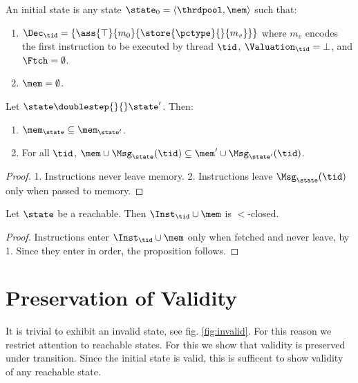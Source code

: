 %
\begin{definition}
An initial state is any state $\state_0 = \langle \thrdpool,\mem\rangle$ such that:
\begin{enumerate}
\item $\Dec_\tid=\{\ass{\top}{m_0}{\store{\pctype}{}{m_v}} \}$ where $m_v$ encodes the first instruction to be executed by thread $\tid$, $\Valuation_\tid = \bot$, and $\Ftch = \emptyset$.
\item $\mem = \emptyset$.
\end{enumerate}
\end{definition}
%

\begin{proposition}
\label{prop:storeMonotonicity}
Let $\state\doublestep{}{}\state'$. Then:
\begin{enumerate}
\item $\mem_{\state}\subseteq\mem_{\state'}$.
\item For all $\tid$, $\mem\cup\Msg_\state(\tid)\subseteq\mem'\cup\Msg_{\state'}(\tid)$.
\end{enumerate}
\end{proposition}
\begin{proof}
1. Instructions never leave memory. 2. Instructions leave $\Msg_{\state}(\tid)$ only when passed to memory. 
\end{proof}

\begin{proposition}
\label{prop: downwardsClosure}
Let $\state$ be a reachable. Then $\Inst_{\tid}\cup\mem$ is $<$-closed.
\end{proposition}
\begin{proof}
Instructions enter $\Inst_\tid\cup\mem$ only when fetched and never leave, by 1. Since they enter in order, the proposition follows.
\end{proof}


\section{Preservation of Validity}


It is trivial to exhibit an invalid state, see fig. \ref{fig:invalid}. For this reason we  restrict attention to reachable states. For this we show that
validity is preserved under transition. Since the initial state is valid, this is sufficent to show validity of any reachable state.

